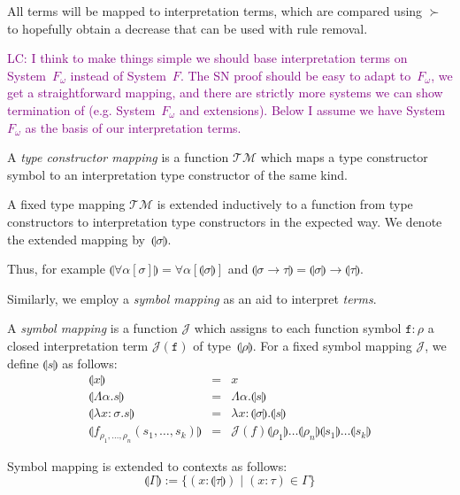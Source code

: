 \documentclass[runningheads,a4paper]{llncs}
\newcommand{\Typemap}{\mathcal{T\!M}}
\newcommand{\Termmap}{\mathcal{J}}
\newcommand{\quant}[2]{\forall #1[#2]}
\newcommand{\typeinterpret}[1]{\llparenthesis #1 \rrparenthesis}
\newcommand{\interpret}[1]{\llparenthesis #1 \rrparenthesis}
\newcommand{\itp}[1]{\llparenthesis #1 \rrparenthesis}
\newcommand{\arrtype}{\rightarrow}
\newcommand{\abs}[2]{\lambda #1.#2}
\newcommand{\tabs}[2]{\Lambda #1.#2}
\newcommand{\LC}[1]{\textcolor{purple}{LC: #1}}
\begin{document}
All terms will be mapped to interpretation terms, which are compared
using $\succ$ to hopefully obtain a decrease that can be used with
rule removal.

\LC{I think to make things simple we should base interpretation terms
  on System~$F_\omega$ instead of System~$F$. The SN proof should be
  easy to adapt to~$F_\omega$, we get a straightforward mapping, and
  there are strictly more systems we can show termination of
  (e.g. System~$F_\omega$ and extensions). Below I assume we have
  System $F_\omega$ as the basis of our interpretation terms.}

\begin{definition}
A \emph{type constructor mapping} is a function $\Typemap$ which maps
a type constructor symbol to an interpretation type constructor of the
same kind.

A fixed type mapping $\Typemap$ is extended inductively to a function
from type constructors to interpretation type constructors in the
expected way. We denote the extended mapping
by~$\typeinterpret{\sigma}$.
\end{definition}

Thus, for example $\typeinterpret{\quant{\alpha}{\sigma}} =
\quant{\alpha}{\typeinterpret{\sigma}}$ and $\typeinterpret{\sigma
\arrtype \tau} = \typeinterpret{\sigma} \arrtype \typeinterpret{\tau}$.

Similarly, we employ a \emph{symbol mapping} as an aid to interpret
\emph{terms}.

\begin{definition}
A \emph{symbol mapping} is a function $\Termmap$ which assigns to each
function symbol $\mathtt{f} : \rho$ a closed interpretation term
$\Termmap(\mathtt{f})$ of type~$\typeinterpret{\rho}$. For a fixed
symbol mapping $\Termmap$, we define $\interpret{s}$ as follows:
\[
\begin{array}{rcl}
\interpret{x} & = & x \\
\interpret{\tabs{\alpha}{s}} & = & \tabs{\alpha}{\interpret{s}} \\
\interpret{\abs{x:\sigma}{s}} & = & \abs{x:\typeinterpret{\sigma}}{
  \interpret{s}} \\
\interpret{f_{\rho_1,\dots,\rho_n}(s_1,\dots,s_k)} & = &
  \Termmap(f) \typeinterpret{\rho_1} \ldots \typeinterpret{\rho_n} \interpret{s_1} \ldots \interpret{s_k}
\end{array}
\]

Symbol mapping is extended to contexts as follows:
\[
\itp{\Gamma} := \{ (x : \typeinterpret{\tau}) \mid (x : \tau) \in \Gamma \}
\]
\end{definition}
\end{document}
